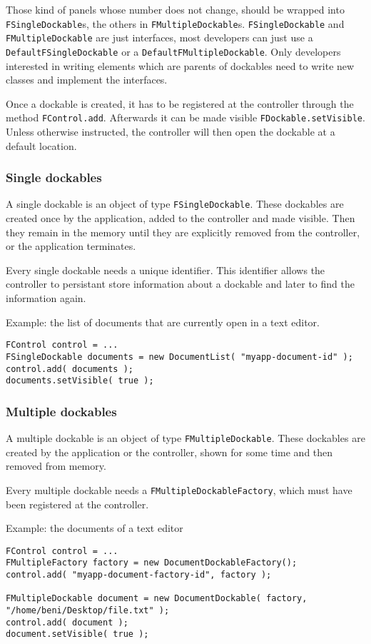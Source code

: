 \documentclass[a4paper,10pt]{article}
\newcommand{\src}[1]{\lstinline[basicstyle=\ttfamily]|#1|}
\begin{document}
Those kind of panels whose number does not change, should be wrapped into \src{FSingleDockable}s, the others in \src{FMultipleDockable}s. \src{FSingleDockable} and \src{FMultipleDockable} are just interfaces, most developers can just use a \src{DefaultFSingleDockable} or a \src{DefaultFMultipleDockable}. Only developers interested in writing elements which are parents of dockables need to write new classes and implement the interfaces.

Once a dockable is created, it has to be registered at the controller through the method \src{FControl.add}. Afterwards it can be made visible \src{FDockable.setVisible}. Unless otherwise instructed, the controller will then open the dockable at a default location.

\subsubsection{Single dockables}
A single dockable is an object of type \src{FSingleDockable}. These dockables are created once by the application, added to the controller and made visible. Then they remain in the memory until they are explicitly removed from the controller, or the application terminates.

Every single dockable needs a unique identifier. This identifier allows the controller to persistant store information about a dockable and later to find the information again.

Example: the list of documents that are currently open in a text editor.
\begin{lstlisting}
FControl control = ...
FSingleDockable documents = new DocumentList( "myapp-document-id" );
control.add( documents );
documents.setVisible( true );
\end{lstlisting}

\subsubsection{Multiple dockables}
A multiple dockable is an object of type \src{FMultipleDockable}. These dockables are created by the application or the controller, shown for some time and then removed from memory.

Every multiple dockable needs a \src{FMultipleDockableFactory}, which must have been registered at the controller.

Example: the documents of a text editor
\begin{lstlisting}
FControl control = ...
FMultipleFactory factory = new DocumentDockableFactory();
control.add( "myapp-document-factory-id", factory );

FMultipleDockable document = new DocumentDockable( factory, "/home/beni/Desktop/file.txt" );
control.add( document );
document.setVisible( true );
\end{lstlisting}
\end{document}

